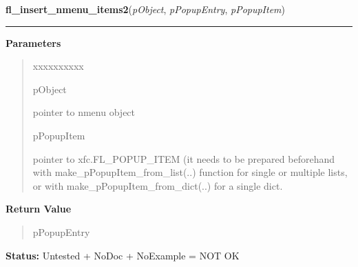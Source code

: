     \vspace{0.5ex}

\hspace{.8\funcindent}\begin{boxedminipage}{\funcwidth}

    \raggedright \textbf{fl\_insert\_nmenu\_items2}(\textit{pObject}, \textit{pPopupEntry}, \textit{pPopupItem})

    \vspace{-1.5ex}

    \rule{\textwidth}{0.5\fboxrule}
\setlength{\parskip}{2ex}
\setlength{\parskip}{1ex}
      \textbf{Parameters}
      \vspace{-1ex}

      \begin{quote}
        \begin{Ventry}{xxxxxxxxxx}

          \item[pObject]

          pointer to nmenu object

          \item[pPopupItem]

          pointer to xfc.FL\_POPUP\_ITEM (it needs to be prepared 
          beforehand with make\_pPopupItem\_from\_list(..) function for 
          single or multiple lists, or with 
          make\_pPopupItem\_from\_dict(..) for a single dict.

        \end{Ventry}

      \end{quote}

      \textbf{Return Value}
    \vspace{-1ex}

      \begin{quote}
      pPopupEntry

      \end{quote}

\textbf{Status:} Untested + NoDoc + NoExample = NOT OK



    \end{boxedminipage}

    \label{xformslib:library:fl_replace_nmenu_items2}

    \vspace{0.5ex}

